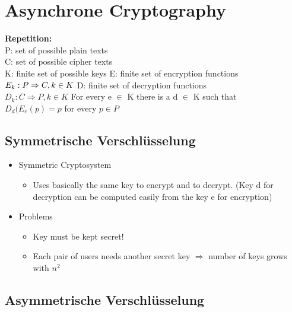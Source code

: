 \hypertarget{asynchrone-cryptography}{%
\section{Asynchrone Cryptography}\label{asynchrone-cryptography}}

\textbf{Repetition:} \\
P: set of possible plain texts  \\
C: set of possible cipher texts \\
K: finite set of possible keys 
E: finite set of encryption functions\\
$E_k : P \Rightarrow C, k \in K \\$
D: finite set of decryption functions\\
$D_k : C \Rightarrow P, k \in K$
For every e $\in$ K there is a d $\in$ K such that\\
$D_d (E_e(p) = p$ for every $p \in P$

\hypertarget{symmetrische-verschluxfcsselung}{%
\subsection{Symmetrische
Verschlüsselung}\label{symmetrische-verschluxfcsselung}}

\begin{itemize}
\tightlist
\item
  Symmetric Cryptosystem

  \begin{itemize}
  \tightlist
  \item
    Uses basically the same key to encrypt and to decrypt. (Key d for decryption can be computed easily from the key e for encryption)
  \end{itemize}
\item
  Problems

  \begin{itemize}
  \tightlist
  \item
    Key must be kept secret!
  \item
    Each pair of users needs another secret key $\Rightarrow$ number of keys grows
    with $n^2$
  \end{itemize}
\end{itemize}

\hypertarget{asymmetrische-verschluxfcsselung}{%
\subsection{Asymmetrische
Verschlüsselung}\label{asymmetrische-verschluxfcsselung}}

